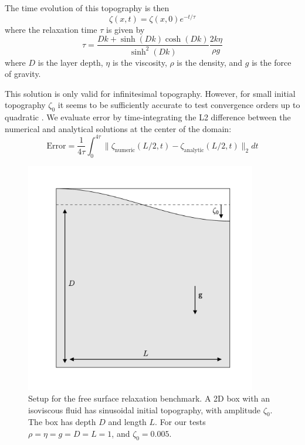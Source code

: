 \documentclass[preprint,12pt,authoryear]{elsarticle}
\begin{document}
The time evolution of this topography is then
\begin{equation}
\zeta(x, t) = \zeta(x,0) e^{-t/\tau}
\end{equation}
where the relaxation time $\tau$ is given by
\begin{equation}
\tau = \frac{D k + \sinh(D k) \cosh(D k)}{ \sinh^2 (D k) } \frac{2 k \eta}{\rho g}
\end{equation}
where $D$ is the layer depth, $\eta$ is the viscosity, $\rho$ is the density, and $g$ is the force of gravity.

This solution is only valid for infinitesimal topography. However, for small
initial topography $\zeta_0$ it seems to be sufficiently accurate to test convergence orders up 
to quadratic \citep{kramer2012implicit, furuichi2015implicit}.
We evaluate error by time-integrating the L2 difference between the numerical and analytical
solutions at the center of the domain:
\begin{equation}
\mathrm{Error} = \frac{1}{4\tau}\int_0^{4 \tau} \lVert \zeta_\mathrm{numeric}(L/2, t) - \zeta_\mathrm{analytic}(L/2, t) \rVert_2 dt
\end{equation}

\begin{figure}
\includegraphics[width=0.9\textwidth]{figures/benchmark_setup.pdf}
\caption{Setup for the free surface relaxation benchmark. A 2D box with an isoviscous fluid has sinusoidal initial topography, with amplitude $\zeta_0$. The box has depth $D$ and length $L$. For our tests $\rho = \eta = g = D = L = 1$, and $\zeta_0 = 0.005$.}
\label{fig:benchmark_setup}
\end{figure}
\end{document}
